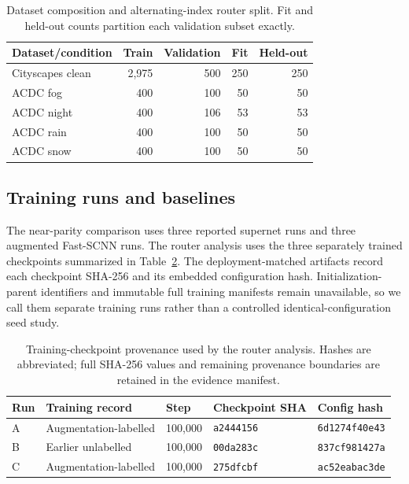 \documentclass[a4paper,review,12pt]{elsarticle}
\begin{document}
\begin{table}[H]
\centering
\caption{Dataset composition and alternating-index router split. Fit and held-out counts partition each validation subset exactly.}
\label{tab:dataset-splits}
\small
\begin{tabular}{@{}lrrrr@{}}
\toprule
Dataset/condition & Train & Validation & Fit & Held-out \\
\midrule
Cityscapes clean & 2,975 & 500 & 250 & 250 \\
ACDC fog   & 400 & 100 & 50 & 50 \\
ACDC night & 400 & 106 & 53 & 53 \\
ACDC rain  & 400 & 100 & 50 & 50 \\
ACDC snow  & 400 & 100 & 50 & 50 \\
\bottomrule
\end{tabular}
\end{table}

\subsection{Training runs and baselines}

The near-parity comparison uses three reported supernet runs and three augmented Fast-SCNN runs. The router analysis uses the three separately trained checkpoints summarized in Table~\ref{tab:provenance}. The deployment-matched artifacts record each checkpoint SHA-256 and its embedded configuration hash. Initialization-parent identifiers and immutable full training manifests remain unavailable, so we call them separate training runs rather than a controlled identical-configuration seed study.

\begin{table}[H]
\centering
\caption{Training-checkpoint provenance used by the router analysis. Hashes are abbreviated; full SHA-256 values and remaining provenance boundaries are retained in the evidence manifest.}
\label{tab:provenance}
\small
\begin{tabularx}{\textwidth}{@{}lXlll@{}}
\toprule
Run & Training record & Step & Checkpoint SHA & Config hash \\
\midrule
A & Augmentation-labelled & 100,000 & \texttt{a2444156} & \texttt{6d1274f40e43} \\
B & Earlier unlabelled & 100,000 & \texttt{00da283c} & \texttt{837cf981427a} \\
C & Augmentation-labelled & 100,000 & \texttt{275dfcbf} & \texttt{ac52eabac3de} \\
\bottomrule
\end{tabularx}
\end{table}
\end{document}
